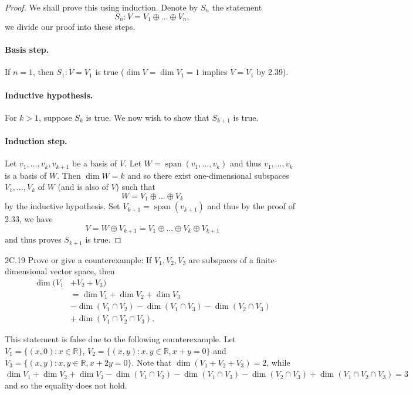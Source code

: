 \documentclass{exam}
\DeclareMathOperator{\spn}{span}
\begin{document}
\begin{proof}
    We shall prove this using induction. Denote by $S_n$ the statement \[
        S_n: V = V_1 \oplus \dots \oplus V_n,
    \]
    we divide our proof into these steps.

    \paragraph{Basis step.} If $n = 1$, then $S_1: V = V_1$ is true ($\dim V = \dim V_1 = 1$ implies $V = V_1$ by 2.39).

    \paragraph{Inductive hypothesis.} For $k > 1$, suppose $S_k$ is true. We now wish to show that $S_{k + 1}$ is true.

    \paragraph{Induction step.} Let $v_1, \dots, v_k, v_{k + 1}$ be a basis of $V$. Let $W = \spn(v_1, \dots, v_k)$ and thus $v_1, \dots, v_k$ is a basis of $W$. Then $\dim W = k$ and so there exist one-dimensional subspaces $V_1, \dots, V_k$ of $W$ (and is also of $V$) such that \[
        W = V_1 \oplus \dots \oplus V_k
    \]
    by the inductive hypothesis. Set $V_{k + 1} = \spn(v_{k + 1})$ and thus by the proof of 2.33, we have \[
        V = W\oplus V_{k + 1} = V_1 \oplus \dots \oplus V_k \oplus V_{k+1} 
    \]
    and thus proves $S_{k + 1}$ is true.
\end{proof}

\begin{problem}{2C.19}
    Prove or give a counterexample: If $V_1, V_2, V_3$ are subspaces of a finite-dimensional vector space, then
        \begin{align*}
            \dim(V_1 &+ V_2 + V_3)\\
            &=\dim V_1 + \dim V_2 + \dim V_3\\
            &-\dim(V_1 \cap V_2) - \dim(V_1 \cap V_3) - \dim(V_2 \cap V_3)\\
            &+\dim(V_1 \cap V_2 \cap V_3).
        \end{align*}
\end{problem}

This statement is false due to the following counterexample. Let $V_1 = \{(x, 0) : x\in\mathbb R\}$, $V_2 = \{(x, y) : x, y\in\mathbb R, x + y = 0\}$ and $V_3 = \{(x, y) : x, y\in\mathbb R, x + 2y = 0\}$. Note that $\dim(V_1 + V_2 + V_3) = 2$, while $\dim V_1 + \dim V_2 + \dim V_3 - \dim(V_1 \cap V_2) - \dim(V_1 \cap V_3) - \dim(V_2 \cap V_3) + \dim(V_1 \cap V_2 \cap V_3) = 3$ and so the equality does not hold.
\end{document}
